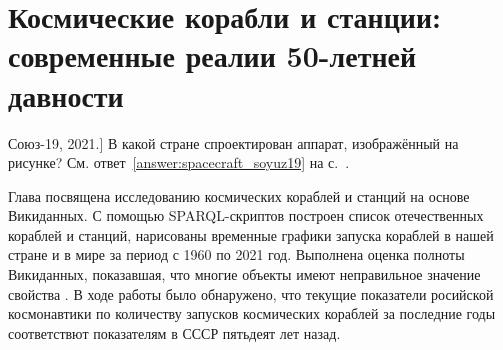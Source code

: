 \chapter{Космические корабли и станции: современные реалии 50-летней давности}
\label{ch:spacecraft-space-station}

\begin{marginfigure}[2.0cm]
{
	\setlength{\fboxsep}{0pt}%
	\setlength{\fboxrule}{1pt}%
}
\caption
[Союз-19, 2021.]
{
В какой стране спроектирован аппарат, изображённый на рисунке?
См. ответ~\ref{answer:spacecraft_soyuz19} на с.~\pageref{answer:spacecraft_soyuz19}.
}
\label{question:spacecraft_soyuz19}
\end{marginfigure}

Глава посвящена исследованию космических кораблей и станций на основе Викиданных. 
С помощью SPARQL-скриптов построен список отечественных кораблей и станций, 
нарисованы временные графики запуска кораблей в нашей стране и в мире за период с 1960 по 2021 год. 
Выполнена оценка полноты Викиданных, показавшая, 
что многие объекты имеют неправильное значение свойства 
. В ходе работы было обнаружено, что текущие показатели росийской космонавтики по количеству запусков космических кораблей за последние годы соответствют показателям в СССР пятьдеят лет назад. 

